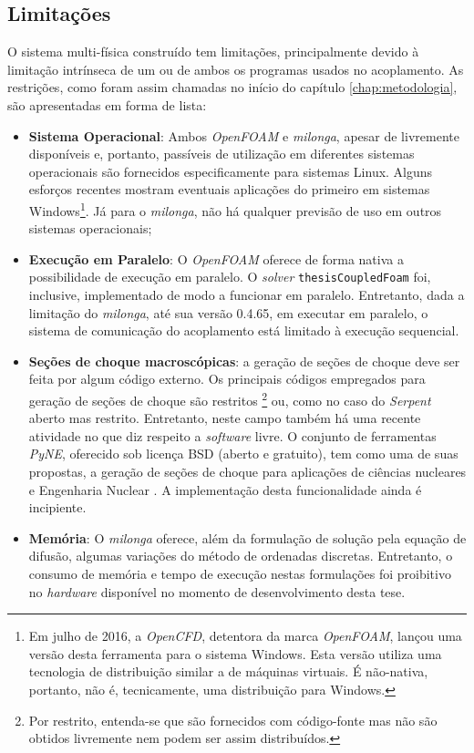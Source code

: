 \subsection{Limitações}
\label{subsec:lim}

O sistema multi-física construído tem limitações, principalmente devido à limitação intrínseca de um ou de ambos
os programas usados no acoplamento. As restrições, como foram assim chamadas no início do capítulo
\ref{chap:metodologia}, são apresentadas
em forma de lista:

\begin{itemize}
\item \textbf{Sistema Operacional}: Ambos \textit{OpenFOAM} e \textit{milonga}, apesar de livremente disponíveis e,
  portanto, passíveis de utilização em diferentes sistemas operacionais são fornecidos especificamente
  para sistemas Linux. Alguns esforços recentes mostram eventuais aplicações do primeiro em sistemas
  Windows\footnote{Em julho de 2016, a \textit{OpenCFD}, detentora da marca \textit{OpenFOAM}, lançou
    uma versão desta ferramenta para o sistema Windows. Esta versão utiliza uma tecnologia de distribuição
    similar a de máquinas virtuais. É não-nativa, portanto, não é, tecnicamente, uma distribuição para Windows.}.
  Já para o \textit{milonga}, não há qualquer previsão de uso em outros sistemas operacionais;
\item \textbf{Execução em Paralelo}: O \textit{OpenFOAM} oferece de forma nativa a possibilidade de execução em
  paralelo. O \textit{solver} \texttt{thesisCoupledFoam} foi, inclusive, implementado de modo a funcionar em paralelo.
  Entretanto, dada a limitação do \textit{milonga}, até sua versão 0.4.65, em executar em paralelo, o sistema
  de comunicação do acoplamento está limitado à execução sequencial.
\item \textbf{Seções de choque macroscópicas}: a geração de seções de choque deve ser feita por algum código externo. Os
  principais códigos empregados para geração de seções de choque são restritos
  \footnote{Por restrito, entenda-se que são fornecidos com código-fonte mas não são obtidos livremente
  nem podem ser assim distribuídos.}
  ou, como no
  caso do \textit{Serpent} aberto mas restrito. Entretanto, neste campo também há uma recente
  atividade no que diz respeito a \textit{software} livre. O conjunto de ferramentas \textit{PyNE},
  oferecido sob licença BSD (aberto e gratuito), tem como uma de suas propostas, a geração de seções
  de choque para aplicações de ciências nucleares e Engenharia Nuclear \cite{Slaybaugh2014}. A implementação
  desta funcionalidade ainda é incipiente.
\item \textbf{Memória}: O \textit{milonga} oferece, além da formulação de solução pela equação de difusão,
  algumas variações do método de ordenadas discretas. Entretanto, o consumo de memória e tempo de execução
  nestas formulações foi proibitivo no \textit{hardware} disponível no momento de desenvolvimento desta tese.
\end{itemize}


